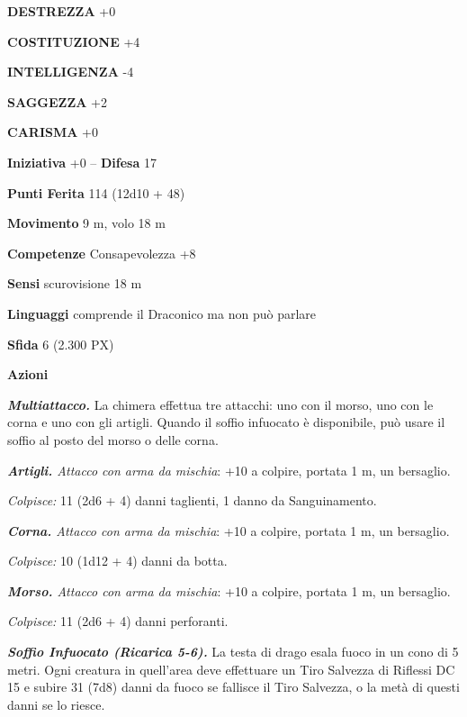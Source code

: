 \begin{multicols}{2}
\textbf{DESTREZZA} +0

\textbf{COSTITUZIONE} +4

\textbf{INTELLIGENZA} -4

\textbf{SAGGEZZA} +2

\textbf{CARISMA} +0

\textbf{Iniziativa} +0 -- \textbf{Difesa} 17

\textbf{Punti Ferita} 114 (12d10 + 48)

\textbf{Movimento} 9 m, volo 18 m

\textbf{Competenze} Consapevolezza +8

\textbf{Sensi} scurovisione 18 m

\textbf{Linguaggi} comprende il Draconico ma non può parlare

\textbf{Sfida} 6 (2.300 PX)

\textbf{Azioni}

\textit{\textbf{Multiattacco.}} La chimera effettua tre attacchi: uno con il morso, uno con le corna e uno con gli artigli. Quando il soffio infuocato è disponibile, può usare il soffio al posto del morso o delle corna.

\textit{\textbf{Artigli.} Attacco con arma da mischia}: +10 a colpire, portata 1 m, un bersaglio.

\textit{Colpisce:} 11 (2d6 + 4) danni taglienti, 1 danno da Sanguinamento.

\textit{\textbf{Corna.} Attacco con arma da mischia}: +10 a colpire, portata 1 m, un bersaglio.

\textit{Colpisce:} 10 (1d12 + 4) danni da botta.

\textit{\textbf{Morso.} Attacco con arma da mischia}: +10 a colpire, portata 1 m, un bersaglio.

\textit{Colpisce:} 11 (2d6 + 4) danni perforanti.

\textit{\textbf{Soffio Infuocato (Ricarica 5-6).}} La testa di drago esala fuoco in un cono di 5 metri. Ogni creatura in quell'area deve effettuare un Tiro Salvezza di Riflessi DC 15 e subire 31 (7d8) danni da fuoco se fallisce il Tiro Salvezza, o la metà di questi danni se lo riesce.


\end{multicols}
